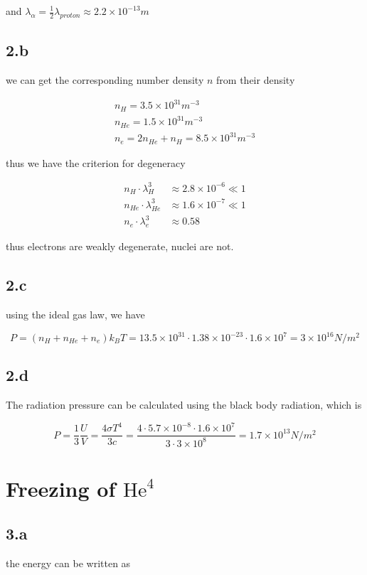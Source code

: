 \documentclass{article}
\begin{document}
and $\lambda_{\alpha} = \frac{1}{2}\lambda_{proton} \approx 2.2\times 10^{-13}m$

\subsection*{2.b}
we can get the corresponding number density $n$ from their density

$$
\begin{aligned}
    n_H = 3.5\times 10^{31} m^{-3}\\
    n_{He} = 1.5\times 10^{31} m^{-3}\\
    n_{e} = 2n_{He} + n_{H} = 8.5\times 10^{31} m^{-3}
\end{aligned}
$$

thus we have the criterion for degeneracy

$$
\begin{aligned}
    n_{H} \cdot \lambda_{H}^3 &\approx 2.8\times 10^{-6} \ll 1\\
    n_{He} \cdot \lambda_{He}^3 &\approx 1.6\times 10^{-7} \ll 1\\
    n_{e} \cdot \lambda_{e}^3 &\approx 0.58
\end{aligned}
$$

thus electrons are weakly degenerate, nuclei are not.

\subsection*{2.c}
using the ideal gas law, we have

$$
P = (n_H + n_{He} + n_{e}) k_B T = 13.5 \times 10^{31} \cdot 1.38\times 10^{-23} \cdot 1.6 \times 10^7 = 3\times 10^{16} N/m^2
$$

\subsection*{2.d}
The radiation pressure can be calculated using the black body radiation, which is

$$
P = \frac{1}{3} \frac{U}{V} = \frac{4\sigma T^4}{3c} = \frac{4 \cdot 5.7\times 10^{-8} \cdot 1.6\times 10^7}{3 \cdot 3\times 10^8} = 1.7\times 10^{13} N/m^2
$$

\section*{Freezing of $\text{He}^4$}
\subsection*{3.a}
the energy can be written as
\end{document}
